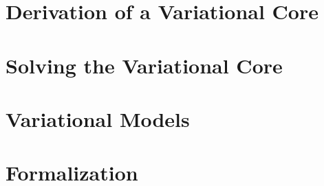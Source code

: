 \section{Derivation of a Variational Core}


\section{Solving the Variational Core}


\section{Variational Models}


\section{Formalization}


% 
%

